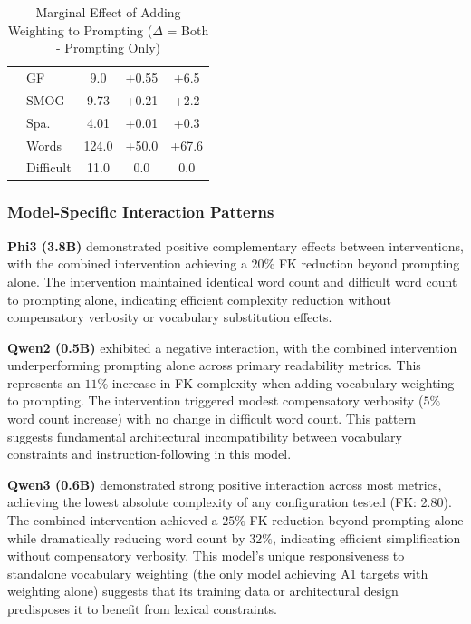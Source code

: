 \documentclass[10pt, a4paper]{article}
\begin{document}
\begin{table}[!ht]
\begin{center}
\begin{tabular}{llccc}
          & GF          & 9.0  & +0.55 & +6.5 \\
          & SMOG        & 9.73  & +0.21 & +2.2  \\
          & Spa.        & 4.01  & +0.01 & +0.3 \\
          & Words       & 124.0  & +50.0 & +67.6 \\
          & Difficult & 11.0   & 0.0   & 0.0   \\
\hline
\end{tabular}
\caption{Marginal Effect of Adding Weighting to Prompting ($\Delta$ = Both - Prompting Only)}
\label{tab:table2}
\end{center}
\end{table}

\subsubsection{Model-Specific Interaction Patterns}


\textbf{Phi3 (3.8B)} demonstrated positive complementary effects between interventions, with the combined intervention achieving a $20\%$ FK reduction beyond prompting alone. The intervention maintained identical word count and difficult word count to prompting alone, indicating efficient complexity reduction without compensatory verbosity or vocabulary substitution effects.

\textbf{Qwen2 (0.5B)} exhibited a negative interaction, with the combined intervention underperforming prompting alone across primary readability metrics. This represents an $11\%$ increase in FK complexity when adding vocabulary weighting to prompting. The intervention triggered modest compensatory verbosity ($5\%$ word count increase) with no change in difficult word count. This pattern suggests fundamental architectural incompatibility between vocabulary constraints and instruction-following in this model.

\textbf{Qwen3 (0.6B)} demonstrated strong positive interaction across most metrics, achieving the lowest absolute complexity of any configuration tested (FK: 2.80). The combined intervention achieved a $25\%$ FK reduction beyond prompting alone while dramatically reducing word count by $32\%$, indicating efficient simplification without compensatory verbosity. This model's unique responsiveness to standalone vocabulary weighting (the only model achieving A1 targets with weighting alone) suggests that its training data or architectural design predisposes it to benefit from lexical constraints.
\end{document}
